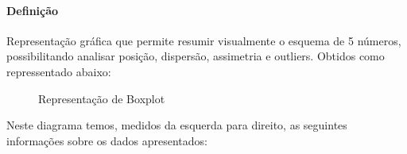 \documentclass{article}
\begin{document}
            \paragraph{Definição}Representação gráfica que permite resumir visualmente o esquema de 5 números, possibilitando analisar posição, dispersão, assimetria e outliers. Obtidos como repressentado abaixo:
                \begin{figure}[H]
                    \centering
                    \caption{Representação de Boxplot}
                \end{figure} \noindent
            Neste diagrama temos, medidos da esquerda para direito, as seguintes informações sobre os dados apresentados:
\end{document}
